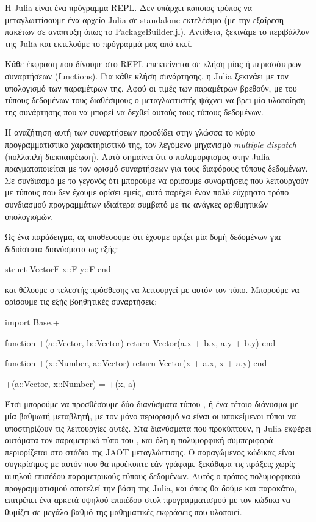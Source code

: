 Η Julia είναι ένα πρόγραμμα REPL.
Δεν υπάρχει κάποιος τρόπος να μεταγλωττίσουμε ένα αρχείο Julia σε standalone εκτελέσιμο (με την εξαίρεση πακέτων σε ανάπτυξη όπως το PackageBuilder.jl).
Αντίθετα, ξεκινάμε το περιβάλλον της Julia και εκτελούμε το πρόγραμμά μας από εκεί.

Κάθε έκφραση που δίνουμε στο REPL επεκτείνεται σε κλήση μίας ή περισσότερων συναρτήσεων (functions).
Για κάθε κλήση συνάρτησης, η Julia ξεκινάει με τον υπολογισμό των παραμέτρων της.
Αφού οι τιμές των παραμέτρων βρεθούν, με του τύπους δεδομένων τους διαθέσιμους ο μεταγλωττιστής ψάχνει να βρει μία υλοποίηση της συνάρτησης που να μπορεί να δεχθεί αυτούς τους τύπους δεδομένων.

Η αναζήτηση αυτή των συναρτήσεων προσδίδει στην γλώσσα το κύριο προγραμματιστικό χαρακτηριστικό της, τον λεγόμενο μηχανισμό \emph{multiple dispatch} (πολλαπλή διεκπαιρέωση).
Αυτό σημαίνει ότι ο πολυμορφισμός στην Julia πραγματοποιείται με τον ορισμό συναρτήσεων για τους διαφόρους τύπους δεδομένων.
Σε συνδιασμό με το γεγονός ότι μπορούμε να ορίσουμε συναρτήσεις που λειτουργούν με τύπους που δεν έχουμε ορίσει εμείς, αυτό παρέχει έναν πολύ εύχρηστο τρόπο συνδιασμού προγραμμάτων ιδιαίτερα συμβατό με τις ανάγκες αριθμητικών υπολογισμών.

Ως ένα παράδειγμα, ας υποθέσουμε ότι έχουμε ορίζει μία δομή δεδομένων για διδιάστατα διανύσματα ως εξής:

{\large
\begin{jllisting}[language=julia,style=jlcodestyle]
struct Vector{F}
    x::F
    y::F
end
\end{jllisting}
}

και θέλουμε ο τελεστής πρόσθεσης \jlinl{+} να λειτουργεί με αυτόν τον τύπο.
Μπορούμε να ορίσουμε τις εξής βοηθητικές συναρτήσεις:

{\large
\begin{jllisting}[language=julia,style=jlcodestyle]
import Base.+

function +(a::Vector, b::Vector)
    return Vector(a.x + b.x, a.y + b.y)
end

function +(x::Number, a::Vector)
    return Vector(x + a.x, x + a.y)
end

+(a::Vector, x::Number) = +(x, a)
\end{jllisting}
}

Έτσι μπορούμε να προσθέσουμε δύο διανύσματα τύπου , ή ένα τέτοιο διάνυσμα με μία βαθμωτή μεταβλητή, με τον μόνο περιορισμό να είναι οι υποκείμενοι τύποι να υποστηρίζουν τις λειτουργίες αυτές.
Στα διανύσματα που προκύπτουν, η Julia εκφέρει αυτόματα τον παραμετρικό τύπο  του , και όλη η πολυμορφική συμπεριφορά περιορίζεται στο στάδιο της JAOT μεταγλώττισης.
Ο παραγώμενος κώδικας είναι συγκρίσιμος με αυτόν που θα προέκυπτε εάν γράφαμε ξεκάθαρα τις πράξεις χωρίς υψηλού επιπέδου παραμετρικούς τύπους δεδομένων.
Αυτός ο τρόπος πολυμορφικού προγραμματισμού αποτελεί την βάση της Julia, και όπως θα δούμε και παρακάτω, επιτρέπει ένα αρκετά υψηλού επιπέδου στυλ προγραμματισμού με τον κώδικα να θυμίζει σε μεγάλο βαθμό της μαθηματικές εκφράσεις που υλοποιεί.

